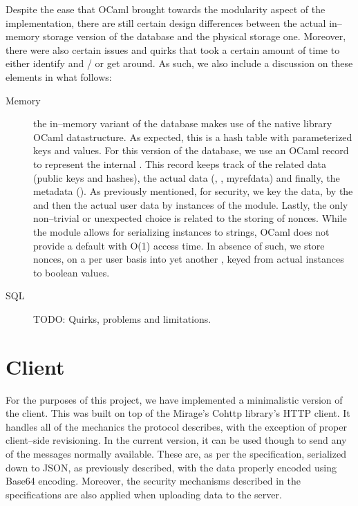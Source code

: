 Despite the ease that OCaml brought towards the modularity aspect of the implementation, there are still certain design differences between the actual in--memory storage version of the database and the physical storage one.
Moreover, there were also certain issues and quirks that took a certain amount of time to either identify and / or get around.
As such, we also include a discussion on these elements in what follows:
\begin{description}
  \item[Memory] the in--memory variant of the database makes use of the native library OCaml  datastructure.
  As expected, this is a hash table with parameterized keys and values.
  For this version of the database, we use an OCaml record to represent the internal .
  This record keeps track of the  related data (public keys and hashes), the actual data (, , myref{data}) and finally, the metadata ().
  As previously mentioned, for security, we key the  data, by the  and then the actual user data by instances of the  module.
  Lastly, the only non--trivial or unexpected choice is related to the storing of nonces.
  While the  module allows for serializing instances to strings, OCaml does not provide a default  with O(1) access time.
  In absence of such, we store nonces, on a per user basis into yet another , keyed from actual  instances to boolean values.
  \item[SQL] TODO: Quirks, problems and limitations.
\end{description}

\section{Client}
For the purposes of this project, we have implemented a minimalistic version of the client.
This was built on top of the Mirage's Cohttp library's HTTP client.
It handles all of the mechanics the protocol describes, with the exception of proper client--side revisioning.
In the current version, it can be used though to send any of the messages normally available.
These are, as per the specification, serialized down to JSON, as previously described, with the data properly encoded using Base64 encoding.
Moreover, the security mechanisms described in the specifications are also applied when uploading data to the server.

